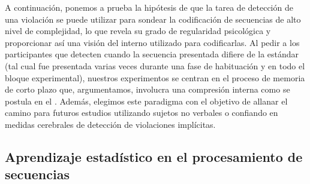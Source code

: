 
A continuación, ponemos a prueba la hipótesis de que la tarea de detección de una violación se puede utilizar para sondear la codificación de secuencias de alto nivel de complejidad, lo que revela su grado de regularidad psicológica y proporcionar así una visión del \lot interno utilizado para codificarlas. Al pedir a los participantes que detecten cuando la secuencia presentada difiere de la estándar (tal cual fue presentada varias veces durante una fase de habituación y en todo el bloque experimental), nuestros experimentos se centran en el proceso de memoria de corto plazo que, argumentamos, involucra una compresión interna como se postula en el \lot. Además, elegimos este paradigma con el objetivo de allanar el camino para futuros estudios utilizando sujetos no verbales o confiando en medidas cerebrales de detección de violaciones implícitas.

\subsection{Aprendizaje estadístico en el procesamiento de secuencias}



